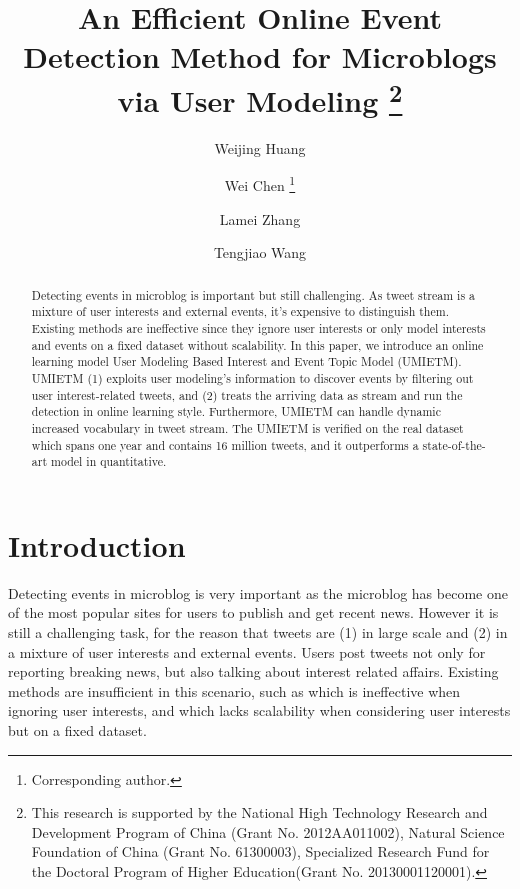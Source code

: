 \documentclass[runningheads,a4paper]{llncs}
\title{An Efficient Online Event Detection Method for Microblogs via User Modeling \thanks{This research is supported by the National High Technology Research and Development Program of China (Grant No. 2012AA011002), Natural Science Foundation of China (Grant No. 61300003), Specialized Research Fund for the Doctoral Program of Higher Education(Grant No. 20130001120001).}}
\begin{document}
\author{Weijing Huang \and Wei Chen \thanks{Corresponding author.}\and Lamei Zhang\and Tengjiao Wang}
%
\maketitle
\thispagestyle{empty}
\pagestyle{empty}
%
%

\begin{abstract}
Detecting events in microblog is important but still challenging. As tweet stream is a mixture of user interests and external events, it’s expensive to distinguish them.
Existing methods are ineffective since they ignore user interests or only model interests and events on a fixed dataset without scalability. In this paper, we introduce an online learning model User Modeling Based Interest and Event Topic Model (UMIETM). UMIETM (1) exploits user modeling's information to discover events by filtering out user interest-related tweets, and (2) treats the arriving data as stream and run the detection in online learning style. Furthermore, UMIETM can handle dynamic increased vocabulary in tweet stream. The UMIETM is verified on the real dataset which spans one year and contains 16 million tweets, and it outperforms a state-of-the-art model in quantitative.
\end{abstract}
\section{Introduction}
Detecting events in microblog is very important as the microblog has become one of the most popular sites for users to publish and get recent news.
However it is still a challenging task, for the reason that tweets are (1) in large scale and (2) in a mixture of user interests and external events.
Users post tweets not only for reporting breaking news, but also talking about interest related affairs.
Existing methods are insufficient in this scenario, such as \cite{lau2012line} which is ineffective when ignoring user interests, and \cite{timeUserLDA2012finding} which lacks scalability when considering user interests but on a fixed dataset.
\end{document}
